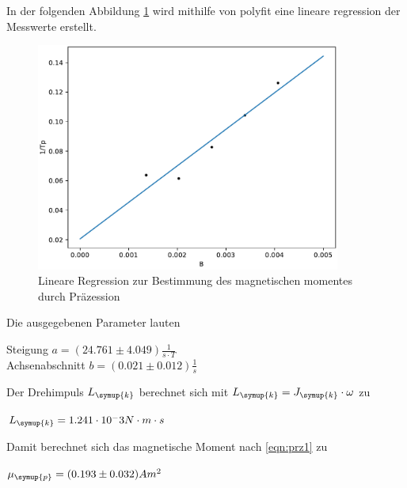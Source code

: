 In der folgenden Abbildung \ref{fig:plot3} wird mithilfe von polyfit \cite{numpy} eine lineare regression der Messwerte erstellt.
\begin{figure}
  \centering
  \includegraphics[width =10cm]{plot3.pdf}
  \caption{Lineare Regression zur Bestimmung des magnetischen momentes durch Präzession}
  \label{fig:plot3}
\end{figure}

Die ausgegebenen Parameter lauten\\
\begin{centering}
Steigung $a = (24.761 ± 4.049) \frac{1}{s \cdot T}$\\
Achsenabschnitt $b =(0.021 ± 0.012) \frac{1}{s}$\\
\end{centering}

Der Drehimpuls $L_{\symup{k}}$ berechnet sich mit $L_{\symup{k}} = J_{\symup{k}} \cdot \omega$ \cite{V105} zu\\

\begin{centering}

  $L_{\symup{k}} = 1.241 \cdot 10^-3 N\cdot m\cdot s$\\

\end{centering}

Damit berechnet sich das magnetische Moment nach \ref{eqn:prz1} zu\\

\begin{centering}

  $\mu_{\symup{p}} = (0.193 \pm 0.032) Am^2$\\
  
\end{centering}
 


